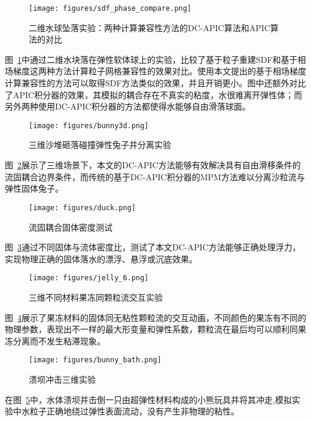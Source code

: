 \begin{figure}[htbp]
    \centering
    \texttt{[image: figures/sdf\_phase\_compare.png]}
    \caption{二维水球坠落实验：两种计算兼容性方法的DC-APIC算法和APIC算法的对比}
    \label{fig:sdf_phase_compare}
\end{figure}

图~\ref{fig:sdf_phase_compare}中通过二维水块落在弹性软体球上的实验，比较了基于粒子重建SDF和基于相场梯度这两种方法计算粒子网格兼容性的效果对比。使用本文提出的基于相场梯度计算兼容性的方法可以取得SDF方法类似的效果，并且开销更小。图中还额外对比了APIC积分器的效果，其模拟的耦合存在不真实的粘度，水很难离开弹性体；而另外两种使用DC-APIC积分器的方法都使得水能够自由滑落球面。


\begin{figure}[H]
    \centering 
    \texttt{[image: figures/bunny3d.png]} 
    \caption{三维沙堆砸落碰撞弹性兔子并分离实验} 
    \label{fig:bunny3d} 
\end{figure}

图~\ref{fig:bunny3d}展示了三维场景下，本文的DC-APIC方法能够有效解决具有自由滑移条件的流固耦合边界条件，而传统的基于DC-APIC积分器的MPM方法难以分离沙粒流与弹性固体兔子。

\begin{figure}[H]
    \centering
    \texttt{[image: figures/duck.png]}
    \caption{流固耦合固体密度测试}
    \label{fig:duck}
\end{figure}
图~\ref{fig:duck}通过不同固体与流体密度比，测试了本文DC-APIC方法能够正确处理浮力，实现物理正确的固体落水的漂浮、悬浮或沉底效果。

\begin{figure}[H]
    \centering
    \texttt{[image: figures/jelly\_6.png]}
    \caption{三维不同材料果冻同颗粒流交互实验}
    \label{fig:jelly}
\end{figure}
图~\ref{fig:jelly}展示了果冻材料的固体同无粘性颗粒流的交互动画，不同颜色的果冻有不同的物理参数，表现出不一样的最大形变量和弹性系数，颗粒流在最后均可以顺利同果冻分离而不发生粘滞现象。

\begin{figure}[H]
    \centering
    \texttt{[image: figures/bunny\_bath.png]}
    \caption{溃坝冲击三维实验}
    \label{fig:bunny_bath}
\end{figure}
在图~\ref{fig:bunny_bath}中，水体溃坝并击倒一只由超弹性材料构成的小熊玩具并将其冲走,模拟实验中水粒子正确地绕过弹性表面流动，没有产生非物理的粘性。

